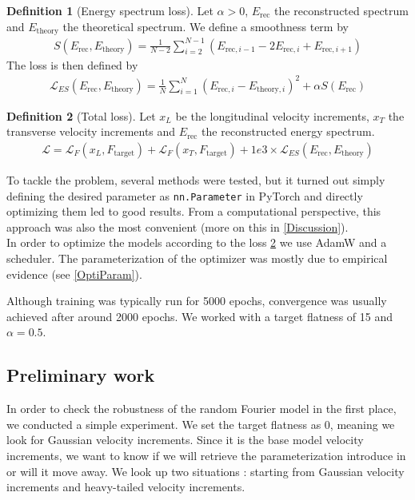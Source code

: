 \documentclass[a4paper,12pt]{article}
\theoremstyle{definition}
\newtheorem{definition}{Definition}
\begin{document}
\begin{definition}[Energy spectrum loss]
    Let $\alpha>0$, $E_\text{rec}$ the reconstructed spectrum and $E_\text{theory}$ the theoretical spectrum.
    We define a smoothness term by 
    \begin{align}
        S(E_\text{rec}, E_\text{theory}) = \frac{1}{N-2}\sum_{i=2}^{N-1}\left(E_{\text{rec},i-1} -2E_{\text{rec},i} + E_{\text{rec},i+1}   \right)
    \end{align}
    The loss is then defined by 
    \begin{align}
        \mathcal{L}_{ES}(E_\text{rec}, E_\text{theory}) = \frac{1}{N} \sum_{i=1}^{N} (E_{\text{rec},i}-E_{\text{theory},i})^2 + \alpha S(E_\text{rec}) 
    \end{align} 
\end{definition}

\begin{definition}[Total loss]
    Let $x_L$ be the longitudinal velocity increments, $x_{T}$ the transverse velocity increments and $E_\text{rec}$ the reconstructed energy spectrum.
    \begin{align}
        \mathcal{L} = \mathcal{L}_F(x_L, F_\text{target}) + \mathcal{L}_F(x_T, F_\text{target}) + 1e3 \times\mathcal{L}_{ES}(E_\text{rec}, E_\text{theory})
    \end{align}
    \label{TotalLoss}
\end{definition}



To tackle the problem, several methods were tested, but it turned out simply defining the desired parameter as \texttt{nn.Parameter} in PyTorch and directly optimizing them led to good results. From a computational perspective, this approach was also the most convenient (more on this in \ref{Discussion}). 
\\
In order to optimize the models according to the loss \ref{TotalLoss} we use AdamW and a scheduler. The parameterization of the optimizer was mostly due to empirical evidence (see \ref{OptiParam}).

Although training was typically run for 5000 epochs, convergence was usually achieved after around 2000 epochs. We worked with a target flatness of 15 and $\alpha=0.5$. \\

\subsection{Preliminary work}
In order to check the robustness of the random Fourier model in the first place, we conducted a simple experiment. We set the target flatness as 0, meaning we look for Gaussian velocity increments. Since it is the base model velocity increments, we want to know if we will retrieve the parameterization introduce in \cite{Janin2021} or will it move away. We look up two situations : starting from Gaussian velocity increments and heavy-tailed velocity increments.
\end{document}
